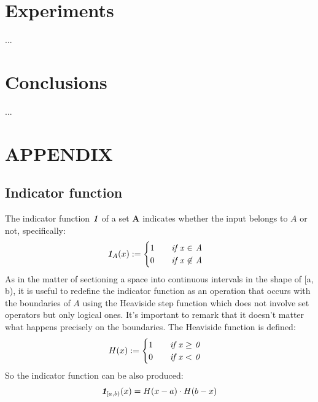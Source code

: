 \documentclass[12pt]{article}
\newcommand{\indfunc}[1]{\textit{\textbf{1}}_{#1}}
\begin{document}
\section{Experiments}
\label{sec:experiments}
...

\section{Conclusions}
\label{sec:conclusions}
...

\section{APPENDIX}
\subsection{Indicator function}
\label{appendix:indicator_function}
The indicator function $\indfunc{}$ of a set \textbf{A} indicates whether the input belongs  to $A$ or not, specifically:
\begin{equation}
\label{eq:indicator_function}
\indfunc{A}(x) := 
\begin{cases}
1 \qquad \text{\textit{if x $\in$ A}}\\
0 \qquad \text{\textit{if x $\not\in$ A}}
 \end{cases}
\end{equation}
As in the matter of sectioning a space into continuous intervals in the shape of [a, b), it is useful to redefine the indicator function as an operation that occurs with the boundaries of $A$ using the Heaviside step function which does not involve set operators but only logical ones. It's important to remark that it doesn't matter what happens precisely on the boundaries. 
The Heaviside function is defined:
\begin{equation}
\label{eq:heaviside}
H(x) := 
\begin{cases}
1 \qquad \text{\textit{if x $\geq$ 0}}\\
0 \qquad \text{\textit{if x $<$ 0}}
\end{cases}
\end{equation}
So the indicator function can be also produced:
\begin{equation}
\label{eq:indicator_function_with_h}
\indfunc{[a,b)}(x) = H(x - a) \cdot H(b - x)
\end{equation}


%
%
%


\printbibliography
\end{document}
